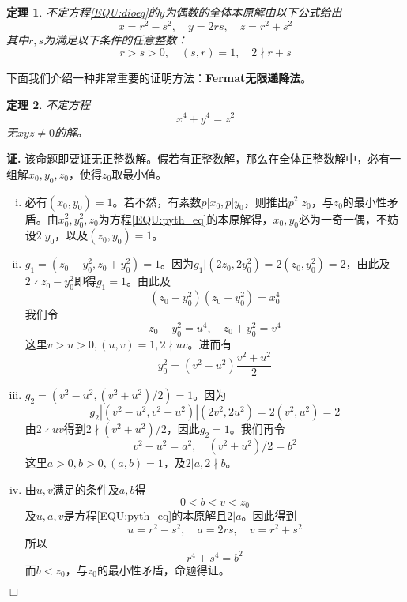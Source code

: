 \documentclass{ctexrep}
\newcommand{\bbold}[1]{\textbf{#1}}
\newtheorem{thrm}{定理}[section]
\renewenvironment{proof}[1][证]{\noindent \textbf{#1.} }{\hfill$\Box$}
\begin{document}
\begin{thrm}
不定方程\ref{EQU:dioeq}的$y$为偶数的全体本原解由以下公式给出
\begin{equation}
x=r^2-s^2,\quad y=2rs,\quad z=r^2+s^2
\end{equation}
其中$r,s$为满足以下条件的任意整数：
\begin{displaymath}
r>s>0,\quad (s,r)=1,\quad 2\nmid r+s
\end{displaymath}
\end{thrm}

下面我们介绍一种非常重要的证明方法：\bbold{Fermat无限递降法}。

\begin{thrm}
不定方程
\begin{equation}
x^4+y^4=z^2
\end{equation}
无$xyz\neq 0$的解。
\end{thrm}
\begin{proof}
该命题即要证无正整数解。假若有正整数解，那么在全体正整数解中，必有一组解$x_0,y_0,z_0$，使得$z_0$取最小值。
\begin{enumerate}[(i)]
\item 必有$(x_0,y_0)=1$。若不然，有素数$p|x_0,p|y_0$，则推出$p^2|z_0$，与$z_0$的最小性矛盾。由$x_0^2,y_0^2,z_0$为方程\ref{EQU:pyth_eq}的本原解得，$x_0,y_0$必为一奇一偶，不妨设$2|y_0$，以及$(z_0,y_0)=1$。
\item $g_1=(z_0-y_0^2,z_0+y_0^2)=1$。因为$g_1|(2z_0,2y_0^2)=2(z_0,y_0^2)=2$，由此及$2\nmid z_0-y_0^2$即得$g_1=1$。由此及
\begin{displaymath}
(z_0-y_0^2)(z_0+y_0^2)=x_0^4
\end{displaymath}
我们令
\begin{displaymath}
z_0-y_0^2=u^4,\quad z_0+y_0^2=v^4
\end{displaymath}
这里$v>u>0,(u,v)=1,2\nmid uv$。进而有
\begin{equation}
y_0^2=(v^2-u^2)\frac{v^2+u^2}{2}
\end{equation}
\item $g_2=(v^2-u^2,(v^2+u^2)/2)=1$。因为
\begin{displaymath}
g_2|(v^2-u^2,v^2+u^2)|(2v^2,2u^2)=2(v^2,u^2)=2
\end{displaymath}
由$2\nmid uv$得到$2\nmid (v^2+u^2)/2$，因此$g_2=1$。我们再令
\begin{displaymath}
v^2-u^2=a^2,\quad (v^2+u^2)/2=b^2
\end{displaymath}
这里$a>0,b>0,(a,b)=1$，及$2|a,2\nmid b$。
\item 由$u,v$满足的条件及$a,b$得
\begin{displaymath}
0<b<v<z_0
\end{displaymath}
及$u,a,v$是方程\ref{EQU:pyth_eq}的本原解且$2|a$。因此得到
\begin{displaymath}
u=r^2-s^2,\quad a=2rs,\quad v=r^2+s^2
\end{displaymath}
所以
\begin{displaymath}
r^4+s^4=b^2
\end{displaymath}
而$b<z_0$，与$z_0$的最小性矛盾，命题得证。
\end{enumerate}
\end{proof}
\end{document}

